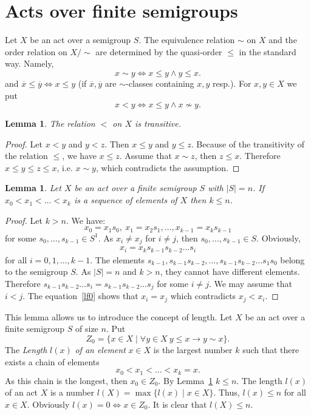 \documentclass{birkau}
\numberwithin{equation}{section}
\theoremstyle{plain}
\newtheorem{lemma}[theorem]{Lemma}
\theoremstyle{definition}
\begin{document}
	\section{Acts over finite semigroups}
	
	Let $X$ be an act over a semigroup $S$. The equivalence relation $\sim$ on $X$ and the order relation on $X/{\sim}$ are determined by the quasi-order $\leqslant$ in the standard way. Namely, $$ x \sim y \Leftrightarrow x \leqslant y \wedge y \leqslant x. $$ and $\overline{x} \leqslant \overline{y} \Leftrightarrow x \leqslant y $ (if $\overline{x}, \overline{y}$ are ${\sim}$-classes containing $x,y$ resp.).
	For $x,y \in X$ we put $$ x < y \Leftrightarrow x \leqslant y \wedge x \nsim y. $$
	
	\begin{lemma} \label{lemma:03}
	    The relation $<$ on $X$ is transitive.
	\end{lemma}
	\begin{proof}
	    Let $x < y$ and $y < z$. Then $x \leqslant y$ and $y \leqslant z$. Because of the transitivity of the relation $\leqslant$, we have $x \leqslant z$. Assume that $x \sim z$, then $z \leqslant x$. Therefore $x \leqslant y \leqslant z \leqslant x$, i.e. $x \sim y$, which contradicts the assumption.
	\end{proof}
	
	\begin{lemma} \label{lemma:04}
	    Let $X$ be an act over a finite semigroup $S$ with $|S| = n$. If $x_0 < x_1 < \ldots < x_k$ is a sequence of elements of $X$ then $k \leqslant n$.
	\end{lemma}
	\begin{proof}
	    Let $k > n$. We have: $$x_0 = x_1 s_0,\ x_1 = x_2s_1, \ldots , x_{k-1} = x_k s_{k-1}$$ for some $s_0,\ldots,s_{k-1} \in S^1$. As $x_i \neq x_j$ for $i \neq j$, then $ s_0,\ldots,s_{k-1} \in S$. Obviously,
		\begin{gather}
			x_i = x_k s_{k-1} s_{k-2} \ldots s_i \label{lf0}
		\end{gather}
		for all $i = 0,1,\ldots,k-1$. The elements $s_{k-1},s_{k-1}s_{k-2},\ldots,s_{k-1}s_{k-2}\ldots s_1s_0$ belong to the semigroup $S$. As $|S| = n$ and $k>n$, they cannot have different elements. Therefore $s_{k-1}s_{k-2}\ldots s_i = s_{k-1}s_{k-2}\ldots s_j$ for some $i\neq j$. We may assume that $i < j$. The equation~\eqref{lf0} shows that $x_i = x_j$ which contradicts $x_j < x_i$.
	\end{proof}
	
	This lemma allows us to introduce the concept of length. Let $X$ be an act over a finite semigroup $S$ of size $n$. Put $$ Z_0 = \{ x \in X \mid \forall y \in X \ y \leqslant x \rightarrow y \sim x \}.$$ The \textit{Length} $l(x)$ \textit{of an element} $x \in X$ is the largest number $k$ such that there exists a chain of elements $$x_0 < x_1 < \ldots < x_k=x.$$ As this chain is the longest, then $x_0 \in Z_0$. By Lemma~\ref{lemma:04} $k \leqslant n$. The length $l(x)$ of an act $X$ is a number $l(X) = \max \{ l(x) \mid x \in X\}$. Thus, $l(x) \leqslant n$ for all $x \in X$. Obviously $l(x) = 0 \Leftrightarrow x \in Z_0$. It is clear that $l(X) \leqslant n$.
	
\end{document}

